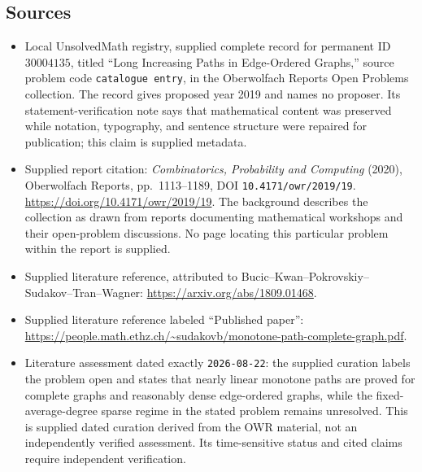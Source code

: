 \documentclass[11pt]{article}
\begin{document}
\subsection{Sources}
\begin{itemize}
\item Local UnsolvedMath registry, supplied complete record for permanent ID \(30004135\), titled ``Long Increasing Paths in Edge-Ordered Graphs,'' source problem code \texttt{catalogue entry}, in the Oberwolfach Reports Open Problems collection. The record gives proposed year 2019 and names no proposer. Its statement-verification note says that mathematical content was preserved while notation, typography, and sentence structure were repaired for publication; this claim is supplied metadata.
\item Supplied report citation: \emph{Combinatorics, Probability and Computing} (2020), Oberwolfach Reports, pp.~1113--1189, DOI \texttt{10.4171/owr/2019/19}. \url{https://doi.org/10.4171/owr/2019/19}. The background describes the collection as drawn from reports documenting mathematical workshops and their open-problem discussions. No page locating this particular problem within the report is supplied.
\item Supplied literature reference, attributed to Bucic--Kwan--Pokrovskiy--Sudakov--Tran--Wagner: \url{https://arxiv.org/abs/1809.01468}.
\item Supplied literature reference labeled ``Published paper'': \url{https://people.math.ethz.ch/~sudakovb/monotone-path-complete-graph.pdf}.
\item Literature assessment dated exactly \texttt{2026-08-22}: the supplied curation labels the problem open and states that nearly linear monotone paths are proved for complete graphs and reasonably dense edge-ordered graphs, while the fixed-average-degree sparse regime in the stated problem remains unresolved. This is supplied dated curation derived from the OWR material, not an independently verified assessment. Its time-sensitive status and cited claims require independent verification.
\end{itemize}
\end{document}
